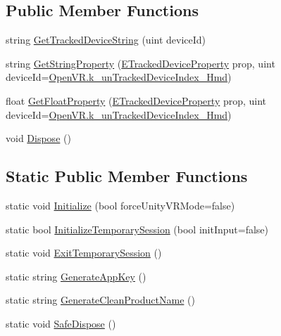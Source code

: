 \subsection*{Public Member Functions}
\begin{DoxyCompactItemize}
\item 
string \mbox{\hyperlink{class_valve_1_1_v_r_1_1_steam_v_r_a13ba3127f1a23072a6b0dfb3caff1a4e}{Get\+Tracked\+Device\+String}} (uint device\+Id)
\item 
string \mbox{\hyperlink{class_valve_1_1_v_r_1_1_steam_v_r_aa666244fcba18f8449b71660f4f39a79}{Get\+String\+Property}} (\mbox{\hyperlink{namespace_valve_1_1_v_r_ab060521ead7273986988fc4897e52482}{E\+Tracked\+Device\+Property}} prop, uint device\+Id=\mbox{\hyperlink{class_valve_1_1_v_r_1_1_open_v_r_ae12d105c6f832aa4524e2608b26896e0}{Open\+V\+R.\+k\+\_\+un\+Tracked\+Device\+Index\+\_\+\+Hmd}})
\item 
float \mbox{\hyperlink{class_valve_1_1_v_r_1_1_steam_v_r_a05f845baaf8d6e9cfe4c9fb39970f305}{Get\+Float\+Property}} (\mbox{\hyperlink{namespace_valve_1_1_v_r_ab060521ead7273986988fc4897e52482}{E\+Tracked\+Device\+Property}} prop, uint device\+Id=\mbox{\hyperlink{class_valve_1_1_v_r_1_1_open_v_r_ae12d105c6f832aa4524e2608b26896e0}{Open\+V\+R.\+k\+\_\+un\+Tracked\+Device\+Index\+\_\+\+Hmd}})
\item 
void \mbox{\hyperlink{class_valve_1_1_v_r_1_1_steam_v_r_acaae89d6f6cdb0682de93832f464b926}{Dispose}} ()
\end{DoxyCompactItemize}
\subsection*{Static Public Member Functions}
\begin{DoxyCompactItemize}
\item 
static void \mbox{\hyperlink{class_valve_1_1_v_r_1_1_steam_v_r_aadf47465fb865356218674c6120f0f28}{Initialize}} (bool force\+Unity\+V\+R\+Mode=false)
\item 
static bool \mbox{\hyperlink{class_valve_1_1_v_r_1_1_steam_v_r_af84660d96abb07e1e6d776a27568f058}{Initialize\+Temporary\+Session}} (bool init\+Input=false)
\item 
static void \mbox{\hyperlink{class_valve_1_1_v_r_1_1_steam_v_r_afb99eabf5440c7e76beefad597182ee1}{Exit\+Temporary\+Session}} ()
\item 
static string \mbox{\hyperlink{class_valve_1_1_v_r_1_1_steam_v_r_a98cdf4fc1441a46697f3e5c6d58f40c6}{Generate\+App\+Key}} ()
\item 
static string \mbox{\hyperlink{class_valve_1_1_v_r_1_1_steam_v_r_a8e23ccbdd8fdb8e26f0c3c9f3ea8e159}{Generate\+Clean\+Product\+Name}} ()
\item 
static void \mbox{\hyperlink{class_valve_1_1_v_r_1_1_steam_v_r_a05fdc10324d14933a6826c40e1106a10}{Safe\+Dispose}} ()
\end{DoxyCompactItemize}
